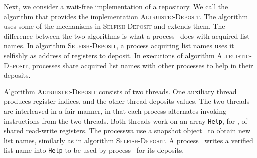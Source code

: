 \documentclass[11pt]{article}
\begin{document}
Next, we consider a wait-free implementation of a repository.
We call the algorithm that provides the implementation \textsc{Altruistic-Deposit}.
The algorithm uses some of the mechanisms in  \textsc{Selfish-Deposit} and extends them.
The difference between the two algorithms is what a process~ does with acquired list names.
In algorithm \textsc{Selfish-Deposit}, a process acquiring list names uses it selfishly as address of registers to deposit.
In executions of algorithm \textsc{Altruistic-Deposit}, processes share acquired list names  with other processes to help in their deposits.

Algorithm \textsc{Altruistic-Deposit} consists of two threads. 
One auxiliary thread produces register indices, and the other thread  deposits values.
The two threads are interleaved in a fair manner, in that each process alternates invoking  instructions from the two threads.
Both threads work on an  array \texttt{Help}, for , of shared read-write registers.
The processwa use a snapshot object~ to obtain new list names, similarly as in algorithm \textsc{Selfish-Deposit}.
A process~ writes  a verified list name  into \texttt{Help}  to be used by process~ for its deposits.
\end{document}
